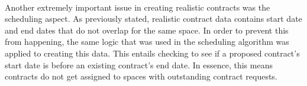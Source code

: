 \\Another extremely important issue in creating realistic contracts was the scheduling aspect. As previously stated, realistic contract data contains start date and end dates that do not overlap for the same space. In order to prevent this from happening, the same logic that was used in the scheduling algorithm was applied to creating this data. This entails checking to see if a proposed contract's start date is before an existing contract's end date. In essence, this means contracts do not get assigned to spaces with outstanding contract requests. 

